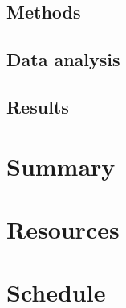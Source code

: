 \documentclass[a4paper,10pt]{article}
\begin{document}
\subsection{Methods}


\subsection{Data analysis}


\subsection{Results}



\section{Summary}


\section{Resources}


\section{Schedule}

\end{document}
